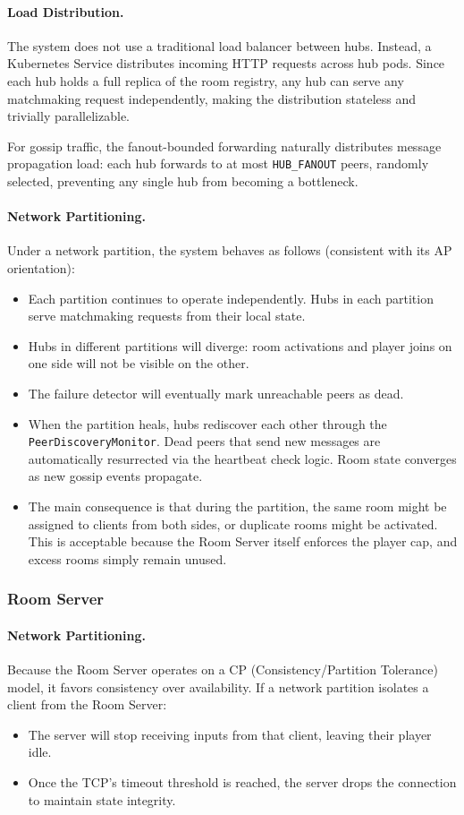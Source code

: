\paragraph{Load Distribution.}
The system does not use a traditional load balancer between hubs.
Instead, a Kubernetes Service distributes incoming HTTP requests across hub pods.
Since each hub holds a full replica of the room registry, any hub can serve any matchmaking request independently, making the distribution stateless and trivially parallelizable.

For gossip traffic, the fanout-bounded forwarding naturally distributes message propagation load: each hub forwards to at most \texttt{HUB\_FANOUT} peers, randomly selected, preventing any single hub from becoming a bottleneck.

\paragraph{Network Partitioning.}
Under a network partition, the system behaves as follows (consistent with its AP orientation):
\begin{itemize}
  \item Each partition continues to operate independently. Hubs in each partition serve matchmaking requests from their local state.
  \item Hubs in different partitions will diverge: room activations and player joins on one side will not be visible on the other.
  \item The failure detector will eventually mark unreachable peers as dead.
  \item When the partition heals, hubs rediscover each other through the \texttt{PeerDiscoveryMonitor}. Dead peers that send new messages are automatically resurrected via the heartbeat check logic. Room state converges as new gossip events propagate.
  \item The main consequence is that during the partition, the same room might be assigned to clients from both sides, or duplicate rooms might be activated. This is acceptable because the Room Server itself enforces the player cap, and excess rooms simply remain unused.
\end{itemize}

\subsubsection{Room Server}

\paragraph{Network Partitioning.}
Because the Room Server operates on a CP (Consistency/Partition Tolerance) model, it favors consistency over availability.
If a network partition isolates a client from the Room Server:
\begin{itemize}
  \item The server will stop receiving inputs from that client, leaving their player idle.
  \item Once the TCP's timeout threshold is reached, the server drops the connection to maintain state integrity.
\end{itemize}

